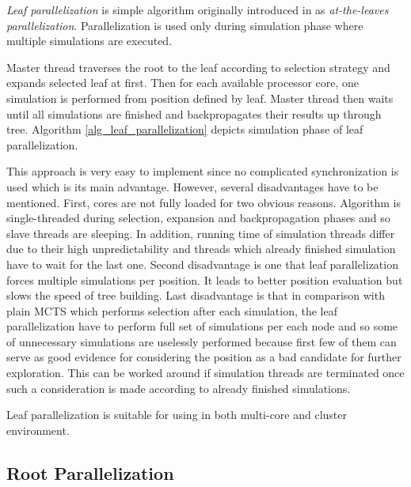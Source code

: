 \emph{Leaf parallelization} is simple algorithm originally introduced in \cite{Cazenave2007} as
\emph{at-the-leaves parallelization}. Parallelization is used only during simulation phase where
multiple simulations are executed. 

Master thread traverses the root to the leaf according to selection strategy and expands selected
leaf at first. Then for each available processor core, one simulation is performed from position
defined by leaf. Master thread then waits until all simulations are finished and backpropagates
their results up through tree. Algorithm \ref{alg_leaf_parallelization} depicts simulation phase 
of leaf parallelization.

This approach is very easy to implement since no complicated synchronization is used
which is its main advantage. However, several disadvantages have to be mentioned. First, cores are
not fully loaded for two obvious reasons. Algorithm is single-threaded during selection, expansion
and backpropagation phases and so slave threads are sleeping. In addition, running time of
simulation threads differ due to their high unpredictability and threads which already finished
simulation have to wait for the last one. Second disadvantage is one that leaf parallelization
forces multiple simulations
per position. It leads to better position evaluation but slows the speed of tree building. Last
disadvantage is that in comparison with plain MCTS which performs selection after each simulation,
the leaf parallelization have to perform full set of simulations per each node and so some of
unnecessary simulations are uselessly performed because first few of them can serve as good evidence
for considering the position as a bad candidate for further exploration. This can be worked around
if simulation threads are terminated once such a consideration is made according to already finished
simulations.

Leaf parallelization is suitable for using in both multi-core and cluster environment.


\subsection{Root Parallelization}
\label{sec_root_parallelization}

